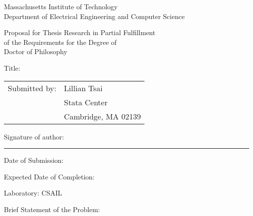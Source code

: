 
\begingroup


\begin{center}
Massachusetts Institute of Technology \\
Department of Electrical Engineering and Computer Science
\end{center}

\begin{center}
Proposal for Thesis Research in Partial Fulfillment \\
of the Requirements for the Degree of \\
Doctor of Philosophy
\end{center}

\vspace{1em}
\noindent Title: \mytitle

\vspace{1em}
\noindent\begin{tabular}{@{}ll}
Submitted by: & Lillian Tsai\\
              & Stata Center\\
              & Cambridge, MA 02139
\end{tabular}

\vspace{1em}
\noindent Signature of author: \rule{5cm}{0.1pt}

\vspace{1em}
\noindent Date of Submission: \mydate

\vspace{1em}
\noindent Expected Date of Completion: \mycompletion

\vspace{1em}
\noindent Laboratory: CSAIL 

\vspace{1em}
\noindent Brief Statement of the Problem:

